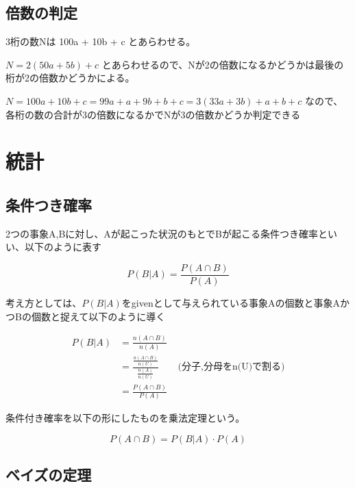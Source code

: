 \documentclass[dvipdfmx]{jsarticle}
\begin{document}
\subsection{倍数の判定}

3桁の数Nは 100a + 10b + c とあらわせる。

$ N = 2(50a + 5b) + c$ とあらわせるので、Nが2の倍数になるかどうかは最後の桁が2の倍数かどうかによる。

$ N = 100a + 10b + c = 99a + a + 9b + b + c = 3(33a + 3b) + a + b + c$ なので、各桁の数の合計が3の倍数になるかでNが3の倍数かどうか判定できる

\section{統計}

\subsection{条件つき確率}

2つの事象A,Bに対し、Aが起こった状況のもとでBが起こる条件つき確率といい、以下のように表す

\[ P(B|A) = \frac{P(A \cap B) }{P(A)} \]

考え方としては、$P(B|A)$をgivenとして与えられている事象Aの個数と事象AかつBの個数と捉えて以下のように導く

\begin{align*}
  P(B|A) &= \frac{n(A\cap B)}{n(A)} \\
         &= \frac{\frac{n(A\cap B)}{n(U)}}{\frac{n(A)}{n(U)}} \qquad \text{(分子,分母をn(U)で割る)} \\
         &= \frac{P(A \cap B)}{P(A)}
\end{align*}

条件付き確率を以下の形にしたものを乗法定理という。

\[ P(A \cap B) = P(B|A) \cdot P(A) \]

\subsection{ベイズの定理}

\newcommand{\highlight}[3][yellow]{\tikz[baseline=(x.base)]{\node[rectangle,rounded corners,fill=#1!10](x){#2} node[below of=x, color=#1]{#3};}}
\end{document}
